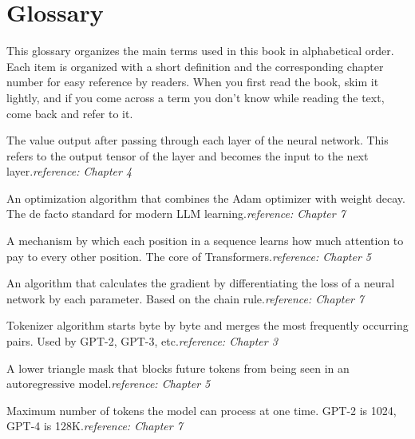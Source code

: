 
\chapter*{Glossary}

This glossary organizes the main terms used in this book in alphabetical order. Each item is organized with a short definition and the corresponding chapter number for easy reference by readers. When you first read the book, skim it lightly, and if you come across a term you don't know while reading the text, come back and refer to it.

\begin{description}[leftmargin=2.5em, style=nextline, font=\bfseries\sffamily\color{inkblue}]

\item [Activation (activation value)]
The value output after passing through each layer of the neural network. This refers to the output tensor of the layer and becomes the input to the next layer.\textit{reference: Chapter 4}

\item [AdamW]
An optimization algorithm that combines the Adam optimizer with weight decay. The de facto standard for modern LLM learning.\textit{reference: Chapter 7}

\item [Attention]
A mechanism by which each position in a sequence learns how much attention to pay to every other position. The core of Transformers.\textit{reference: Chapter 5}

\item [Backpropagation]
An algorithm that calculates the gradient by differentiating the loss of a neural network by each parameter. Based on the chain rule.\textit{reference: Chapter 7}

\item [BPE (Byte Pair Encoding)]
Tokenizer algorithm starts byte by byte and merges the most frequently occurring pairs. Used by GPT-2, GPT-3, etc.\textit{reference: Chapter 3}

\item [Causal Mask]
A lower triangle mask that blocks future tokens from being seen in an autoregressive model.\textit{reference: Chapter 5}

\item [Context Length]
Maximum number of tokens the model can process at one time. GPT-2 is 1024, GPT-4 is 128K.\textit{reference: Chapter 7}


\end{description}
